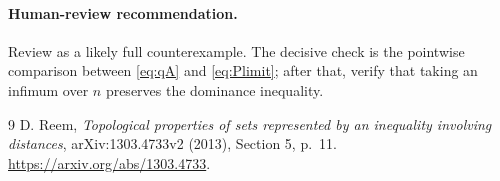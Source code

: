 \documentclass[11pt]{article}
\begin{document}
\paragraph{Human-review recommendation.}
Review as a likely full counterexample. The decisive check is the pointwise comparison between \eqref{eq:qA} and \eqref{eq:Plimit}; after that, verify that taking an infimum over $n$ preserves the dominance inequality.

\begin{thebibliography}{9}
D. Reem,
\emph{Topological properties of sets represented by an inequality involving distances},
arXiv:1303.4733v2 (2013), Section 5, p.~11.
\url{https://arxiv.org/abs/1303.4733}.
\end{thebibliography}
\end{document}
